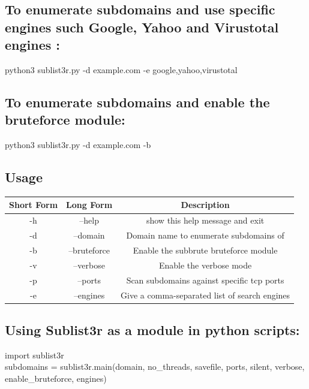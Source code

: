 \documentclass[12pt]{article}
\begin{document}
\subsection{To enumerate subdomains and use specific engines such Google, Yahoo and Virustotal engines :}\label{subsec:to-enumerate-subdomains-and-use-specific-engines-such-google-yahoo-and-virustotal-engines}
python3 sublist3r.py -d example.com -e google,yahoo,virustotal

\subsection{To enumerate subdomains and enable the bruteforce module:}\label{subsec:to-enumerate-subdomains-and-enable-the-bruteforce-module}
python3 sublist3r.py -d example.com -b

\subsection{Usage}\label{subsec:usage}
\begin{center}
    \begin{tabular}{c|c|c}
        \hline
        Short Form & Long Form & Description \\
        \hline
        -h & --help & show this help message and exit \\
        -d & --domain & Domain name to enumerate subdomains of \\
        -b & --bruteforce & Enable the subbrute bruteforce module \\
        -v & --verbose & Enable the verbose mode\\
        -p & --ports & Scan subdomains against specific tcp ports \\
        -e & --engines & Give a comma-separated list of search engines \\
        \hline
    \end{tabular}
\end{center}

\subsection{Using Sublist3r as a module in python scripts:}\label{subsec:using-sublist3r-as-a-module-in-python-scripts}
    import sublist3r \\
    subdomains = sublist3r.main(domain, no\_threads, savefile, ports, silent, verbose, enable\_bruteforce, engines) \\
\end{document}
